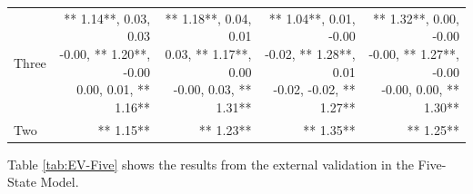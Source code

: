 \documentclass[12pt,PhD,twoside,openright]{muthesis}
\begin{document}
\begin{table}[!h]
\begin{tabular}[t]{l>{\ttfamily}r>{\ttfamily}r>{\ttfamily}r>{\ttfamily}r}
\hspace{1em}Three & \makecell[l]{** 1.14**,  0.03,  0.03\\ -0.00, ** 1.20**, -0.00\\  0.00,  0.01, ** 1.16**} & \makecell[l]{** 1.18**,  0.04,  0.01\\  0.03, ** 1.17**,  0.00\\ -0.00,  0.03, ** 1.31**} & \makecell[l]{** 1.04**,  0.01, -0.00\\ -0.02, ** 1.28**,  0.01\\ -0.02, -0.02, ** 1.27**} & \makecell[l]{** 1.32**,  0.00, -0.00\\ -0.00, ** 1.27**, -0.00\\ -0.00,  0.00, ** 1.30**}\\
\rowcolor{gray!6}  \hspace{1em}Two & ** 1.15** & ** 1.23** & ** 1.35** & ** 1.25**\\
\bottomrule
\end{tabular}
\end{table}
Table \ref{tab:EV-Five} shows the results from the external validation in the Five-State Model.
\end{document}
